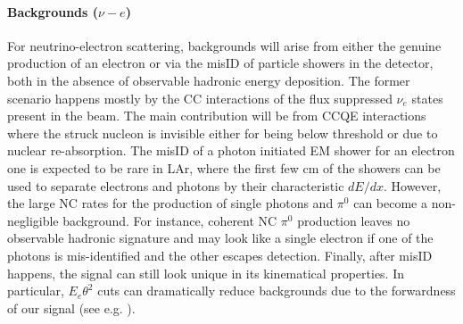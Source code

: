 \paragraph{Backgrounds ($\nu-e$)} For neutrino-electron scattering, backgrounds will arise from either the genuine production of an electron or via the misID of particle showers in the detector, both in the absence of observable hadronic energy deposition. The former scenario happens mostly by the CC interactions of the flux suppressed $\nu_e$ states present in the beam. The main contribution will be from CCQE interactions where the struck nucleon is invisible either for being below threshold or due to nuclear re-absorption. The misID of a photon initiated EM shower for an electron one is expected to be rare in LAr, where the first few cm of the showers can be used to separate electrons and photons by their characteristic $dE/dx$. However, the large NC rates for the production of single photons and $\pi^0$ can become a non-negligible background. For instance, coherent NC $\pi^0$ production leaves no observable hadronic signature and may look like a single electron if one of the photons is mis-identified and the other escapes detection. Finally, after misID happens, the signal can still look unique in its kinematical properties. In particular, $E_e \theta^2$ cuts can dramatically reduce backgrounds due to the forwardness of our signal (see e.g. \cite{Park:2013dax,Park:2015eqa}).

